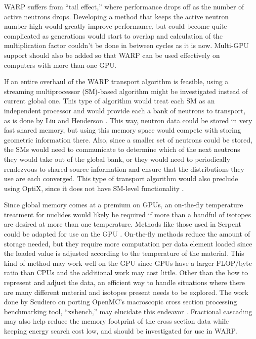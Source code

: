 \documentclass[preprint,12pt]{elsarticle}
\begin{document}
WARP suffers from ``tail effect,'' where performance drops off as the number of active neutrons drops.  Developing a method that keeps the active neutron number high would greatly improve performance, but could become quite complicated as generations would start to overlap and calculation of the multiplication factor couldn't be done in between cycles  as it is now.  Multi-GPU support should also be added so that WARP can be used effectively on computers with more than one GPU.

If an entire overhaul of the WARP transport algorithm is feasible, using a streaming multiprocessor (SM)-based algorithm might be investigated instead of current global one.  This type of algorithm would treat each SM as an independent processor and would provide each a bank of neutrons to transport, as is done by Liu and Henderson \cite{tianyu,henderson}.   This way, neutron data could be stored in very fast shared memory, but using this memory space would compete with storing geometric information there.  Also, since a smaller set of neutrons could be stored, the SMs would need to communicate to determine which of the next neutrons they would take out of the global bank, or they would need to periodically rendezvous to shared source information and ensure that the distributions they use are each converged.  This type of transport algorithm would also preclude using OptiX, since it does not have SM-level functionality \cite{optix}.

Since global memory comes at a premium on GPUs, an on-the-fly temperature treatment for nuclides would likely be required if more than a handful of isotopes are desired at more than one temperature.  Methods like those used in Serpent could be adapted for use on the GPU \cite{serpent}.  On-the-fly methods reduce the amount of storage needed, but they require more computation per data element loaded since the loaded value is adjusted according to the temperature of the material.  This kind of method may work well on the GPU since GPUs have a larger FLOP/byte ratio than CPUs and the additional work may cost little.  Other than the how to represent and adjust the data, an efficient way to handle situations where there are many different material and isotopes present needs to be explored.  The work done by Scudiero on porting OpenMC's macroscopic cross section processing benchmarking tool, ``xsbench,'' may elucidate this endeavor \cite{openmc,scudiero}.   Fractional cascading may also help reduce the memory footprint of the cross section data while keeping energy search cost low, and should be investigated for use in WARP\cite{Lund2015}.
\end{document}
